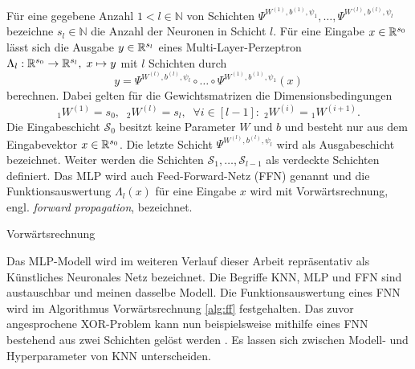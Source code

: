 \begin{defi}
    \label{def:MLP}
    Für eine gegebene Anzahl $1<l \in \mathbb{N}$ von Schichten $\Psi^{W^{(1)},b^{(1)},\psi_{1}}, \ldots, \Psi^{W^{(l)},b^{(l)},\psi_{l}}$ bezeichne $s_l \in \mathbb{N}$ die Anzahl der Neuronen in Schicht $l$. Für eine Eingabe $x \in \mathbb{R}^{s_0}$ lässt sich die Ausgabe $y \in \mathbb{R}^{s_l}$ eines Multi-Layer-Perzeptron  $\Lambda_l: \mathbb{R}^{s_0} \rightarrow \mathbb{R}^{s_l}, \; x \mapsto y$ mit $l$ Schichten durch
    \[
        y=\Psi^{W^{(l)},b^{(l)},\psi_{l}} \circ \ldots \circ \Psi^{W^{(1)},b^{(1)},\psi_{1}}(x)
    \]
    berechnen. Dabei gelten für die Gewichtsmatrizen die Dimensionsbedingungen
    \[{}_1W^{(1)}=s_0, \; \; {}_2W^{(l)}=s_l, \; \; \forall i \in [l-1]: \; {}_2W^{(i)}={}_1W^{(i+1)}.
        \] 
    Die Eingabeschicht $\mathcal{S}_0$ besitzt keine Parameter $W$ und $b$ und besteht nur aus dem Eingabevektor $x \in \mathbb{R}^{s_0}$. Die letzte Schicht $\Psi^{W^{(l)},b^{(l)},\psi_{l}}$ wird als Ausgabeschicht bezeichnet. Weiter werden die Schichten $\mathcal{S}_1, \ldots, \mathcal{S}_{l-1}$ als verdeckte Schichten definiert. Das MLP wird auch Feed-Forward-Netz (FFN)  genannt und die Funktionsauswertung $\Lambda_l(x)$ für eine Eingabe $x$ wird mit Vorwärtsrechnung, engl. \textit{forward propagation}, bezeichnet.
\end{defi}

\begin{algorithm}
    \caption{Vorwärtsrechnung}\label{alg:ff}
\end{algorithm}
    


Das MLP-Modell wird im weiteren Verlauf dieser Arbeit repräsentativ als Künstliches Neuronales Netz bezeichnet. Die Begriffe KNN, MLP und FFN sind austauschbar und meinen dasselbe Modell. Die Funktionsauswertung eines FNN wird im Algorithmus Vorwärtsrechnung \ref{alg:ff} festgehalten. Das zuvor angesprochene XOR-Problem kann nun beispielsweise mithilfe eines FNN bestehend aus zwei Schichten gelöst werden \cite{Goodfellow-et-al-2016}.
Es lassen sich zwischen Modell- und Hyperparameter von KNN unterscheiden.

